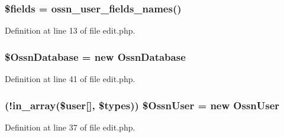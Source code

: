 \subsubsection[{\texorpdfstring{\$fields}{$fields}}]{\setlength{\rightskip}{0pt plus 5cm}\$fields = {\bf ossn\+\_\+user\+\_\+fields\+\_\+names}()}\hypertarget{actions_2administrator_2user_2edit_8php_ab2303c817e3b402b77b7f99627b9c319}{}\label{actions_2administrator_2user_2edit_8php_ab2303c817e3b402b77b7f99627b9c319}


Definition at line 13 of file edit.\+php.

\subsubsection[{\texorpdfstring{\$\+Ossn\+Database}{$OssnDatabase}}]{\setlength{\rightskip}{0pt plus 5cm}\${\bf Ossn\+Database} = new {\bf Ossn\+Database}}\hypertarget{actions_2administrator_2user_2edit_8php_a8579dda900a1e2336bb710006263bc02}{}\label{actions_2administrator_2user_2edit_8php_a8579dda900a1e2336bb710006263bc02}


Definition at line 41 of file edit.\+php.

\subsubsection[{\texorpdfstring{\$\+Ossn\+User}{$OssnUser}}]{ (!in\+\_\+array(\${\bf user}\mbox{[}\textquotesingle{}\mbox{]}, \${\bf types})) \${\bf Ossn\+User} = new {\bf Ossn\+User}}\hypertarget{actions_2administrator_2user_2edit_8php_a737f7f6b93addd37d85f4ed89e4de785}{}\label{actions_2administrator_2user_2edit_8php_a737f7f6b93addd37d85f4ed89e4de785}


Definition at line 37 of file edit.\+php.

